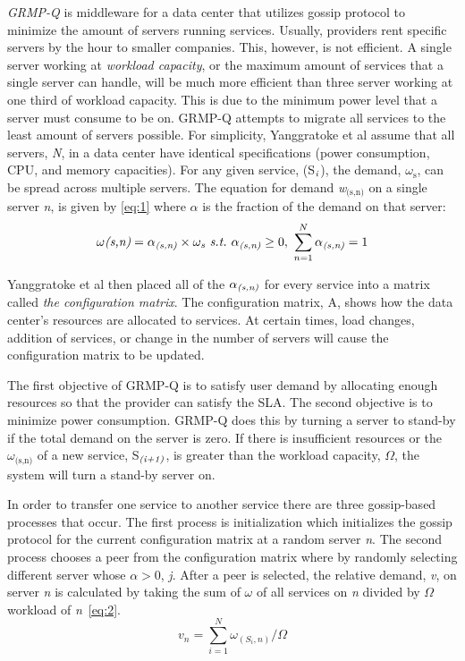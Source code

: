 \documentclass{sig-alternate}
\begin{document}
\emph{GRMP-Q} is middleware for a data center that utilizes gossip protocol to minimize the amount of servers running services. Usually, providers rent specific servers by the hour to smaller companies. This, however, is not efficient. A single server working at  \emph{workload capacity}, or the maximum amount of services that a single server can handle, will be much more efficient than three server working at one third of workload capacity. This is due to the minimum power level that a server must consume to be on. GRMP-Q attempts to migrate all services to the least amount of servers possible.  For simplicity, Yanggratoke et al assume that all servers, \emph{N}, in a data center have identical specifications (power consumption, CPU, and memory capacities). For any given service, (S$_{\text{\emph{i}}}$), the demand, \emph{$\omega_{\text{s}}$}, can be spread across multiple servers. The equation for demand \emph{w$_{\text{(s,n)}}$} on a single server \emph{n}, is given by \eqref{eq:1} where \emph{$\alpha$} is the fraction of the demand on that server:
\begin{equation}
\omega\emph{(s,n)} = \alpha_\emph{(s,n)} \times \omega_\emph{s} \text{\emph{~s.t.~}} \alpha_\emph{(s,n)} \geq 0,~ \sum_{n=1}^{N} \alpha_\emph{(s,n)} = 1 \label{eq:1}
\end{equation}

Yanggratoke et al then placed all of the \emph{$\alpha_\emph{(s,n)}$} for every service into a matrix called \emph{the configuration matrix}. The configuration matrix, A, shows how the data center's resources are allocated to services. At certain times, load changes, addition of services, or change in the number of servers will cause the configuration matrix to be updated. 

The first objective of GRMP-Q is to satisfy user demand by allocating enough resources so that the provider can satisfy the SLA. The second objective is to minimize power consumption. GRMP-Q does this by turning a server to stand-by if the total demand on the server is zero. If there is insufficient resources or the \emph{$\omega_{\text{(s,n)}}$} of a new service, S$_{\text{\emph{(i+1)}}}$, is greater than the workload capacity, $\Omega$, the system will turn a stand-by server on. 

In order to transfer one service to another service there are three gossip-based processes that occur. The first process is initialization which initializes the gossip protocol for the current configuration matrix at a random server \emph{n}.  The second process chooses a peer from the configuration matrix where by randomly selecting different server whose $\alpha > 0$, \emph{j}. After a peer is selected, the relative demand, \emph{v}, on server \emph{n} is calculated by taking the sum of \emph{$\omega$} of all services on \emph{n} divided by $\Omega$ workload of \emph{n}~\eqref{eq:2}.
\begin{equation}
v_n = \sum_{i=1}^N \omega_{(S_i,n)}/\Omega\label{eq:2}
\end{equation}
\end{document}
